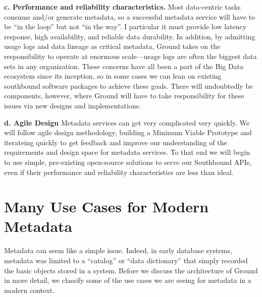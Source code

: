 \documentclass[10pt,letterpaper]{article}
\begin{document}
\vspace{0.5em}\noindent
\textbf{c. Performance and reliability characteristics.} Most data-centric tasks consume and/or generate metadata, so a successful metadata service will have to be ``in the loop'' but not ``in the way''.  I particular it must provide low latency response, high availability, and reliable data durability.  In addition, by admitting usage logs and data lineage as critical metadata, Ground takes on the responsibility to operate at enormous scale---usage logs are often the biggest data sets in any organization.
These concerns have all been a part of the Big Data ecosystem since its inception, so in some cases we can lean on existing southbound software packages to achieve these goals.  There will undoubtedly be components, however, where Ground will have to take responsibility for these issues via new designs and implementations.

\vspace{0.5em}\noindent
\textbf{d. Agile Design}
Metadata services can get very complicated very quickly.  We will follow agile design methodology, building a Minimum Viable Prototype and iterateing quickly to get feedback and improve our understanding of the requirements and design space for metadata services.  To that end we will begin to use simple, pre-existing open-source solutions to serve our Southbound APIs, even if their performance and reliability characteristics are less than ideal.  



\section{Many Use Cases for Modern Metadata}
Metadata can seem like a simple issue.  Indeed, in early database systems, metadata was limited to a ``catalog'' or ``data dictionary'' that simply recorded the basic objects stored in a system. Before we discuss the architecture of Ground in more detail, we classify some of the use cases we are seeing for metadata in a modern context.
\end{document}
